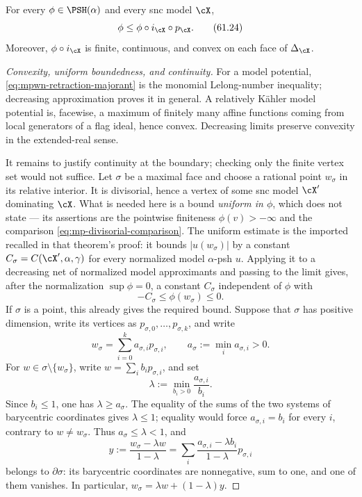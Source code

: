 \begin{theorem}\label{thm:mpwn-convex-restriction}
For every \(\phi\in\PSH(\alpha)\) and every snc model \(\cX\),
\[
                      \phi\leq\phi\circ i_{\cX}\circ p_{\cX}.
\tag{61.24}\label{eq:mpwn-retraction-majorant}
\]
Moreover, \(\phi\circ i_{\cX}\) is finite, continuous, and convex on each
face of \(\Delta_{\cX}\).
\end{theorem}
\begin{proof}[Convexity, uniform boundedness, and continuity]
For a model potential, \eqref{eq:mpwn-retraction-majorant} is the
monomial Lelong-number inequality; decreasing approximation proves it in
general.  A relatively K\"ahler model potential is, facewise, a maximum of
finitely many affine functions coming from local generators of a flag
ideal, hence convex.  Decreasing limits preserve convexity in the
extended-real sense.

It remains to justify continuity at the boundary; checking only the finite
vertex set would not suffice.  Let \(\sigma\) be a maximal face and choose a
rational point \(w_\sigma\) in its relative interior.  It is divisorial,
hence a vertex of some snc model \(\cX'\) dominating \(\cX\).  What is needed
here is a bound \emph{uniform in \(\phi\)}, which
 does not state --- its assertions are the
pointwise finiteness \(\phi(v)>-\infty\) and the comparison
\eqref{eq:mp-divisorial-comparison}.  The uniform estimate is the imported
\cite[Theorem~4.3.3]{MP24} recalled in that theorem's proof: it bounds
\(|u(w_\sigma)|\) by a constant \(C_\sigma=C(\cX',\alpha,\gamma)\) for every
normalized model \(\alpha\)-psh \(u\).  Applying it to a decreasing net of
normalized model approximants and passing to the limit gives, after the
normalization \(\sup\phi=0\), a constant \(C_\sigma\) independent of
\(\phi\) with
\[
                       -C_\sigma\leq\phi(w_\sigma)\leq0.
\]
If \(\sigma\) is a point, this already gives the required bound.
Suppose that \(\sigma\) has positive dimension, write its vertices as
\(p_{\sigma,0},\ldots,p_{\sigma,k}\), and write
\[
 w_\sigma=\sum_{i=0}^k a_{\sigma,i}p_{\sigma,i},
 \qquad
 a_\sigma:=\min_i a_{\sigma,i}>0.
\]
For \(w\in\sigma\setminus\{w_\sigma\}\), write
\(w=\sum_i b_i p_{\sigma,i}\), and set
\[
             \lambda:=\min_{b_i>0}\frac{a_{\sigma,i}}{b_i}.
\]
Since \(b_i\leq1\), one has \(\lambda\geq a_\sigma\).  The equality of
the sums of the two systems of barycentric coordinates gives
\(\lambda\leq1\); equality would force \(a_{\sigma,i}=b_i\) for every
\(i\), contrary to \(w\ne w_\sigma\).  Thus
\(a_\sigma\leq\lambda<1\), and
\[
 y:=\frac{w_\sigma-\lambda w}{1-\lambda}
   =\sum_i\frac{a_{\sigma,i}-\lambda b_i}{1-\lambda}
          p_{\sigma,i}
\]
belongs to \(\partial\sigma\): its barycentric coordinates are
nonnegative, sum to one, and one of them vanishes.  In particular,
\(w_\sigma=\lambda w+(1-\lambda)y\).


\end{proof}
